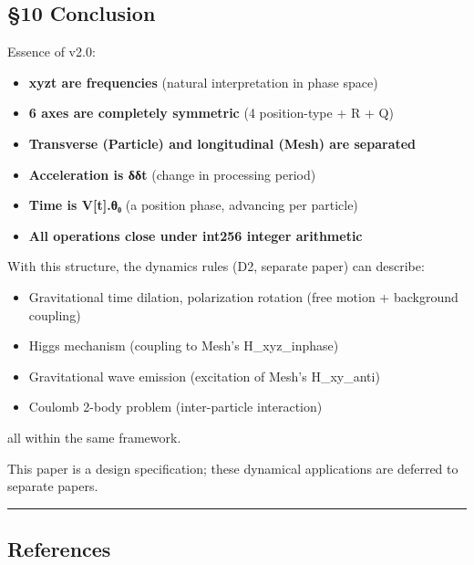 \documentclass[a4paper,11pt]{article}
\providecommand{\tightlist}{\setlength{\itemsep}{0pt}\setlength{\parskip}{0pt}}
\begin{document}
\subsection{§10 Conclusion}\label{conclusion}

Essence of v2.0:

\begin{itemize}
\tightlist
\item
  \textbf{xyzt are frequencies} (natural interpretation in phase space)
\item
  \textbf{6 axes are completely symmetric} (4 position-type + R + Q)
\item
  \textbf{Transverse (Particle) and longitudinal (Mesh) are separated}
\item
  \textbf{Acceleration is δδt} (change in processing period)
\item
  \textbf{Time is V{[}t{]}.θ₀} (a position phase, advancing per
  particle)
\item
  \textbf{All operations close under int256 integer arithmetic}
\end{itemize}

With this structure, the dynamics rules (D2, separate paper) can
describe:

\begin{itemize}
\tightlist
\item
  Gravitational time dilation, polarization rotation (free motion +
  background coupling)
\item
  Higgs mechanism (coupling to Mesh's H\_xyz\_inphase)
\item
  Gravitational wave emission (excitation of Mesh's H\_xy\_anti)
\item
  Coulomb 2-body problem (inter-particle interaction)
\end{itemize}

all within the same framework.

This paper is a design specification; these dynamical applications are
deferred to separate papers.

\begin{center}\rule{0.5\linewidth}{0.5pt}\end{center}

\subsection{References}\label{references}
\end{document}
